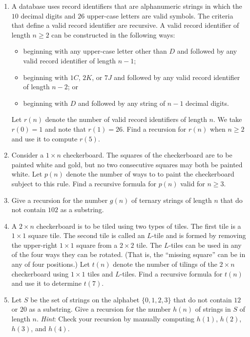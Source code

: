 \begin{enumerate}\item  A database uses record identifiers that are alphanumeric
    strings in which the $10$ decimal digits and $26$ upper-case
    letters are valid symbols. The criteria that define a valid record
    identifier are recursive. A valid record identifier of length
    $n\geq 2$ can be constructed in the following ways:
    \begin{itemize}
    \item beginning with any upper-case letter other than $D$ and
      followed by any valid record identifier of length $n-1$;
    \item beginning with $1C$, $2K$, or $7J$ and followed by any valid
      record identifier of length $n-2$; or
    \item beginning with $D$ and followed by any string of $n-1$
      decimal digits.
    \end{itemize}
    Let $r(n)$ denote the number of valid record identifiers of length
    $n$. We take $r(0)=1$ and note that $r(1) = 26$. Find a recursion
    for $r(n)$ when $n\geq 2$ and use it to compute $r(5)$.
\item    Consider a $1\times n$ checkerboard. The squares of the
    checkerboard are to be painted white and gold, but no two
    consecutive squares may both be painted white. Let $p(n)$ denote
    the number of ways to to paint the checkerboard subject to this
    rule. Find a recursive formula for $p(n)$ valid for $n\geq 3$.
\item   Give a recursion for the number $g(n)$ of ternary strings of
    length $n$ that do not contain $102$ as a substring.

\item A $2\times n$ checkerboard is to be tiled using two types of
  tiles. The first tile is a $1\times 1$ square tile. The second tile
  is called an $L$-tile and is formed by removing the upper-right
  $1\times 1$ square from a $2\times 2$ tile. The $L$-tiles can be
  used in any of the four ways they can be rotated. (That is, the
  ``missing square'' can be in any of four positions.) Let $t(n)$
  denote the number of tilings of the $2\times n$ checkerboard using
  $1\times 1$ tiles and $L$-tiles. Find a recursive formula for $t(n)$ and
  use it to determine $t(7)$.
\item Let $S$ be the set of strings on the alphabet $\{0,1,2,3\}$ that
  do not contain $12$ or $20$ as a substring. Give a recursion for the
  number $h(n)$ of strings in $S$ of length $n$. \textit{Hint}: Check
  your recursion by manually computing $h(1)$, $h(2)$, $h(3)$, and
  $h(4)$.


\end{enumerate}
